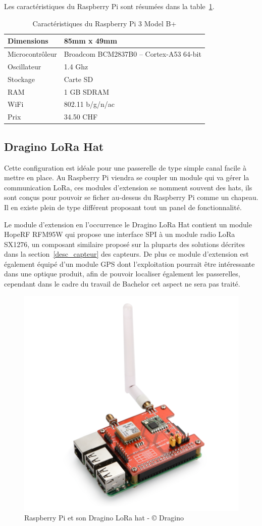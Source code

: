 Les caractéristiques du Raspberry Pi sont résumées dans la table~\ref{tab:raspberry_cara}.

\begin{table}[htb]
\caption[Raspberry Pi Caractéristiques]{Caractéristiques du Raspberry Pi 3 Model B+}
\label{tab:raspberry_cara}
\centering
\begin{tabular}{ l | l }
\toprule
Dimensions & 85mm x 49mm \\
\midrule
Microcontrôleur & Broadcom BCM2837B0 – Cortex-A53 64-bit \\
\midrule
Oscillateur & 1.4 Ghz \\
\midrule
Stockage & Carte SD \\
\midrule
RAM & 1 GB SDRAM \\
\midrule
WiFi & 802.11 b/g/n/ac \\
\midrule
Prix & 34.50 CHF\\
\bottomrule 
\end{tabular}
\end{table}

\subsection{Dragino LoRa Hat}

Cette configuration est idéale pour une passerelle de type simple canal facile à mettre en place. 
Au Raspberry Pi viendra se coupler un module qui va gérer la communication LoRa, ces modules d’extension se nomment souvent des hats, ils sont conçus pour pouvoir se ficher au-dessus du Raspberry Pi comme un chapeau. Il en existe plein de type différent proposant tout un panel de fonctionnalité. 

Le module d’extension en l’occurrence le Dragino LoRa Hat contient un module HopeRF RFM95W qui propose une interface SPI à un module radio LoRa SX1276, un composant similaire proposé sur la pluparts des solutions décrites dans la section~\ref{desc_capteur} des capteurs. De plus ce module d’extension est également équipé d’un module GPS dont l’exploitation pourrait être intéressante dans une optique produit, afin de pouvoir localiser également les passerelles, cependant dans le cadre du travail de Bachelor cet aspect ne sera pas traité.

\begin{figure}[htb]
\centering 
\includegraphics[width=0.5\columnwidth]{../images/RaspberryPI_DraginoHat.png} 
\caption[Raspberry Pi]{Raspberry Pi et son Dragino LoRa hat - © Dragino}
\label{fig:rpi_dragino_hat}
\end{figure}


